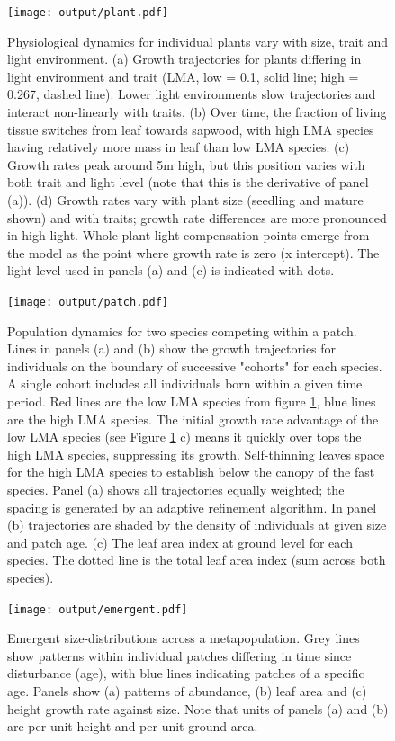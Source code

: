 \documentclass[a4paper,11pt]{article}
\begin{document}
\newpage

\begin{figure}[h!]
\centering
\texttt{[image: output/plant.pdf]}
\caption{Physiological dynamics for individual plants vary with size, trait
and light environment. (a) Growth trajectories for plants differing in light
environment and trait (LMA, low = 0.1, solid line; high =  0.267, dashed
line). Lower light environments slow trajectories and interact non-linearly
with traits. (b) Over time, the fraction of living tissue switches from leaf
towards sapwood, with high LMA species having relatively more mass in leaf
than low LMA species. (c) Growth rates peak around 5m high, but this position
varies with both trait and light level (note that this is the derivative of
panel (a)). (d) Growth rates vary with plant size (seedling and mature shown)
and with traits; growth rate differences are more pronounced in high light.
Whole plant light compensation points emerge from the model as the point where
growth rate is zero (x intercept).  The light level used in panels (a) and (c)
is indicated with dots.}
\label{fig:plant}
\end{figure}

\newpage

\begin{figure}[h!]
\centering
\texttt{[image: output/patch.pdf]}
\caption{Population dynamics for two species competing within a patch. Lines
in panels (a) and (b) show the growth trajectories for individuals on the
boundary of successive "cohorts" for each species. A single cohort includes
all individuals born within a given time period. Red lines are the low LMA
species from figure \ref{fig:plant}, blue lines are the high LMA species.  The
initial growth rate advantage of the low LMA species (see Figure
\ref{fig:plant} c) means it quickly over tops the high LMA species,
suppressing its growth.  Self-thinning leaves space for the high LMA species
to establish below the canopy of the fast species. Panel (a) shows all
trajectories equally weighted; the spacing is generated by an adaptive
refinement algorithm.  In panel (b) trajectories are shaded by the density of
individuals at given size and patch age.  (c) The leaf area index at ground
level for each species.  The dotted line is the total leaf area index (sum
across both species).}
\label{fig:patch}
\end{figure}

\newpage

\begin{figure}[h!]
\centering
\texttt{[image: output/emergent.pdf]}
\caption{Emergent size-distributions across a metapopulation.
Grey lines show patterns within individual patches differing in time since disturbance (age), with blue lines indicating patches of a specific age. Panels show (a) patterns of abundance, (b) leaf area and (c) height growth rate against size. Note that units of panels (a) and (b) are per unit height and per unit ground area. }
\label{fig:emergent}
\end{figure}
\end{document}
